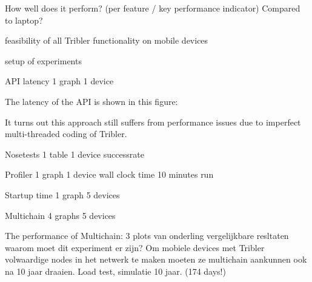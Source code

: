 

How well does it perform? (per feature / key performance indicator)
Compared to laptop?

feasibility of all Tribler functionality on mobile devices


setup of experiments



API latency
1 graph
1 device

The latency of the API is shown in this figure:

It turns out this approach still suffers from performance issues due to imperfect multi-threaded coding of Tribler.


Nosetests
1 table
1 device
successrate


Profiler
1 graph
1 device
wall clock time
10 minutes run


Startup time
1 graph
5 devices


Multichain
4 graphs
5 devices

The performance of Multichain:
3 plots van onderling vergelijkbare resltaten
waarom moet dit experiment er zijn?
Om mobiele devices met Tribler volwaardige nodes in het netwerk te maken moeten ze multichain aankunnen ook na 10 jaar draaien.
Load test, simulatie 10 jaar. (174 days!)
